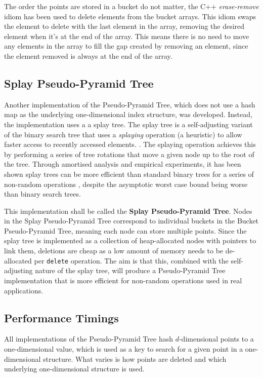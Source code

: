 The order the points are stored in a bucket do not matter, the C++ \textit{erase-remove} idiom has been used to delete elements from the bucket arrays. This idiom swaps the element to delete with the last element in the array, removing the desired element when it's at the end of the array. This means there is no need to move any elements in the array to fill the gap created by removing an element, since the element removed is always at the end of the array.

\subsection{Splay Pseudo-Pyramid Tree}

Another implementation of the Pseudo-Pyramid Tree, which does not use a hash map as the underlying one-dimensional index structure, was developed. Instead, the implementation uses a a splay tree. The splay tree is a self-adjusting variant of the binary search tree that uses a \textit{splaying} operation (a heuristic) to allow faster access to recently accessed elements. \cite{splay-tree}. The splaying operation achieves this by performing a series of tree rotations that move a given node up to the root of the tree. Through amortised analysis and empirical experiments, it has been shown splay trees can be more efficient than standard binary trees for a series of non-random operations \cite{splay-tree}, despite the asymptotic worst case bound being worse than binary search trees.

This implementation shall be called the \textbf{Splay Pseudo-Pyramid Tree}. Nodes in the Splay Pseudo-Pyramid Tree correspond to individual buckets in the Bucket Pseudo-Pyramid Tree, meaning each node can store multiple points. Since the splay tree is implemented as a collection of heap-allocated nodes with pointers to link them, deletions are cheap as a low amount of memory needs to be de-allocated per \texttt{delete} operation. The aim is that this, combined with the self-adjusting nature of the splay tree, will produce a Pseudo-Pyramid Tree implementation that is more efficient for non-random operations used in real applications.

\subsection{Performance Timings}

All implementations of the Pseudo-Pyramid Tree hash $d$-dimensional points to a one-dimensional value, which is used as a key to search for a given point in a one-dimensional structure. What varies is how points are deleted and which underlying one-dimensional structure is used.

